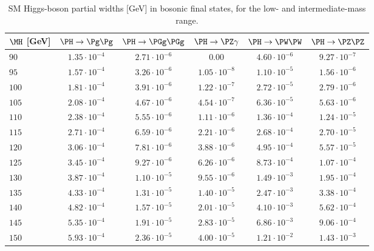 \begin{table}
  \vspace{-\headsep}
  \caption{SM Higgs-boson partial widths [GeV] in bosonic final states, for the low- and intermediate-mass range.}
  \label{tab:Width-lm.part2}
  \centering
  \small
  \begin{tabular}{lccccc}
\hline
$\MH$ [GeV] &
$\PH \rightarrow \Pg\Pg$  &  $\PH \rightarrow \PGg \PGg$ & $\PH 
\rightarrow \PZ\gamma$& $\PH \rightarrow \PW\PW$& $\PH \rightarrow \PZ\PZ$  \\
\hline
$90 $&$ 1.35\cdot 10^{-4} $&$ 2.71\cdot 10^{-6} $&$ 0.00 $&$ 4.60\cdot 10^{-6} $&$ 9.27 \cdot 10^{-7}   $\\
$95 $&$ 1.57\cdot 10^{-4} $&$ 3.26\cdot 10^{-6} $&$ 1.05 \cdot 10^{-8}  $&$ 1.10\cdot 10^{-5} $&$ 1.56\cdot 10^{-6}   $\\
$100 $&$ 1.81\cdot 10^{-4} $&$ 3.91\cdot 10^{-6} $&$ 1.22 \cdot 10^{-7} $&$ 2.72\cdot 10^{-5} $&$ 2.79\cdot 10^{-6}   $\\
$105 $&$ 2.08\cdot 10^{-4} $&$ 4.67\cdot 10^{-6} $&$ 4.54 \cdot 10^{-7} $&$ 6.36\cdot 10^{-5} $&$ 5.63\cdot 10^{-6}   $\\
$110 $&$ 2.38\cdot 10^{-4} $&$ 5.55\cdot 10^{-6} $&$ 1.11\cdot 10^{-6} $&$ 1.36\cdot 10^{-4} $&$ 1.24\cdot 10^{-5}   $\\
$115 $&$ 2.71\cdot 10^{-4} $&$ 6.59\cdot 10^{-6} $&$ 2.21\cdot 10^{-6} $&$ 2.68\cdot 10^{-4} $&$ 2.70\cdot 10^{-5}   $\\
$120 $&$ 3.06\cdot 10^{-4} $&$ 7.81\cdot 10^{-6} $&$ 3.88\cdot 10^{-6} $&$ 4.95\cdot 10^{-4} $&$ 5.57\cdot 10^{-5}   $\\
$125 $&$ 3.45\cdot 10^{-4} $&$ 9.27\cdot 10^{-6} $&$ 6.26\cdot 10^{-6} $&$ 8.73\cdot 10^{-4} $&$ 1.07\cdot 10^{-4}   $\\
$130 $&$ 3.87\cdot 10^{-4} $&$ 1.10\cdot 10^{-5} $&$ 9.55\cdot 10^{-6} $&$ 1.49\cdot 10^{-3} $&$ 1.95\cdot 10^{-4}   $\\
$135 $&$ 4.33\cdot 10^{-4} $&$ 1.31\cdot 10^{-5} $&$ 1.40\cdot 10^{-5} $&$ 2.47\cdot 10^{-3} $&$ 3.38\cdot 10^{-4}   $\\
$140 $&$ 4.82\cdot 10^{-4} $&$ 1.57\cdot 10^{-5} $&$ 2.01\cdot 10^{-5} $&$ 4.10\cdot 10^{-3} $&$ 5.62\cdot 10^{-4}   $\\
$145 $&$ 5.35\cdot 10^{-4} $&$ 1.91\cdot 10^{-5} $&$ 2.83\cdot 10^{-5} $&$ 6.86\cdot 10^{-3} $&$ 9.06\cdot 10^{-4}   $\\
$150 $&$ 5.93\cdot 10^{-4} $&$ 2.36\cdot 10^{-5} $&$ 4.00\cdot 10^{-5} $&$ 1.21\cdot 10^{-2} $&$ 1.43\cdot 10^{-3}   $\\

\end{tabular}
\end{table}
